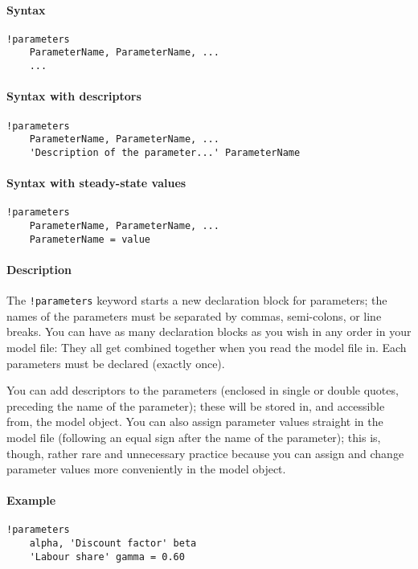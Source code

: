 


	\paragraph{Syntax}\label{syntax}

\begin{verbatim}
!parameters
    ParameterName, ParameterName, ...
    ...
\end{verbatim}

\paragraph{Syntax with descriptors}\label{syntax-with-descriptors}

\begin{verbatim}
!parameters
    ParameterName, ParameterName, ...
    'Description of the parameter...' ParameterName
\end{verbatim}

\paragraph{Syntax with steady-state
values}\label{syntax-with-steady-state-values}

\begin{verbatim}
!parameters
    ParameterName, ParameterName, ...
    ParameterName = value
\end{verbatim}

\paragraph{Description}\label{description}

The \texttt{!parameters} keyword starts a new declaration block for
parameters; the names of the parameters must be separated by commas,
semi-colons, or line breaks. You can have as many declaration blocks as
you wish in any order in your model file: They all get combined together
when you read the model file in. Each parameters must be declared
(exactly once).

You can add descriptors to the parameters (enclosed in single or double
quotes, preceding the name of the parameter); these will be stored in,
and accessible from, the model object. You can also assign parameter
values straight in the model file (following an equal sign after the
name of the parameter); this is, though, rather rare and unnecessary
practice because you can assign and change parameter values more
conveniently in the model object.

\paragraph{Example}\label{example}

\begin{verbatim}
!parameters
    alpha, 'Discount factor' beta
    'Labour share' gamma = 0.60
\end{verbatim}


